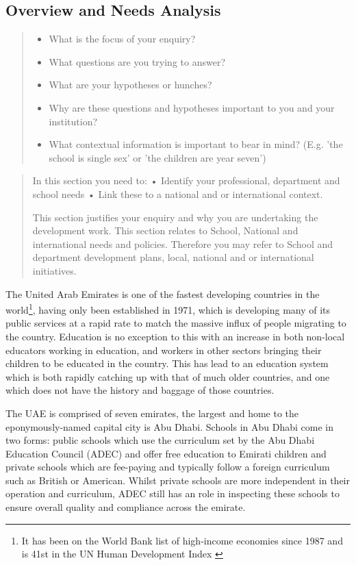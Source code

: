 \subsection{Overview and Needs Analysis}
\begin{quote}
\begin{itemize}

\item  What is the focus of your enquiry?
\item What questions are you trying to answer?
\item What are your hypotheses or hunches?
\item Why are these questions and hypotheses important to you and your institution?
\item What contextual information is important to bear in mind? (E.g. 'the school is single sex' or 'the children are year seven')

\end{itemize}
\end{quote}

\begin{quote}
In this section you need to:
•	Identify your professional, department and school needs
•	Link these to a national and or international context.

This section justifies your enquiry and why you are undertaking the development work. This section relates to School, National and international needs and policies. Therefore you may refer to School and department development plans, local, national and or international initiatives.
\end{quote}

The United Arab Emirates is one of the fastest developing countries in the world\footnote{It has been on the World Bank list of high-income economies since 1987 \cite{worldbank} and is 41st in the UN Human Development Index \cite{WorkforHumanDevelopment2015}}, having only been established in 1971, which is developing many of its public services at a rapid rate to match the massive influx of people migrating to the country. Education is no exception to this with an increase in both non-local educators working in education, and workers in other sectors bringing their children to be educated in the country. This has lead to an education system which is both rapidly catching up with that of much older countries, and one which does not have the history and baggage of those countries. 

The UAE is comprised of seven emirates, the largest and home to the eponymously-named capital city is Abu Dhabi. Schools in Abu Dhabi come in two forms: public schools which use the curriculum set by the Abu Dhabi Education Council (ADEC) and offer free education to Emirati children and private schools which are fee-paying and typically follow a foreign curriculum such as British or American. Whilst private schools are more independent in their operation and curriculum, ADEC still has an role in inspecting these schools to ensure overall quality and compliance across the emirate.

